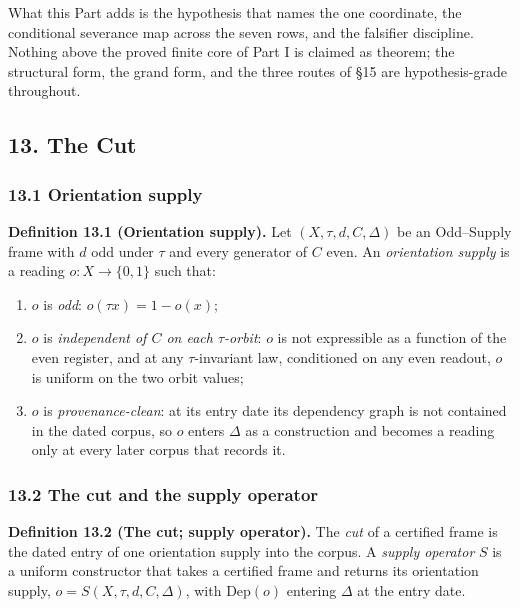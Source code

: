 \documentclass[10pt,twocolumn]{article}
\providecommand{\tightlist}{\setlength{\itemsep}{0pt}\setlength{\parskip}{0pt}}
\begin{document}
What this Part adds is the hypothesis that names the one coordinate, the
conditional severance map across the seven rows, and the falsifier
discipline. Nothing above the proved finite core of Part I is claimed as
theorem; the structural form, the grand form, and the three routes of
§15 are hypothesis-grade throughout.

\subsection{13. The Cut}\label{the-cut}

\subsubsection{13.1 Orientation supply}\label{orientation-supply}

\textbf{Definition 13.1 (Orientation supply).} Let
\((X, \tau, d, C, \Delta)\) be an Odd--Supply frame with \(d\) odd under
\(\tau\) and every generator of \(C\) even. An \emph{orientation supply}
is a reading \(o : X \to \{0,1\}\) such that:

\begin{enumerate}
\def\labelenumi{\arabic{enumi}.}
\tightlist
\item
  \(o\) is \emph{odd}: \(o(\tau x) = 1 - o(x)\);
\item
  \(o\) is \emph{independent of \(C\) on each \(\tau\)-orbit}: \(o\) is
  not expressible as a function of the even register, and at any
  \(\tau\)-invariant law, conditioned on any even readout, \(o\) is
  uniform on the two orbit values;
\item
  \(o\) is \emph{provenance-clean}: at its entry date its dependency
  graph is not contained in the dated corpus, so \(o\) enters \(\Delta\)
  as a construction and becomes a reading only at every later corpus
  that records it.
\end{enumerate}

\subsubsection{13.2 The cut and the supply
operator}\label{the-cut-and-the-supply-operator}

\textbf{Definition 13.2 (The cut; supply operator).} The \emph{cut} of a
certified frame is the dated entry of one orientation supply into the
corpus. A \emph{supply operator} \(S\) is a uniform constructor that
takes a certified frame and returns its orientation supply,
\(o = S(X, \tau, d, C, \Delta)\), with \(\mathrm{Dep}(o)\) entering
\(\Delta\) at the entry date.
\end{document}
